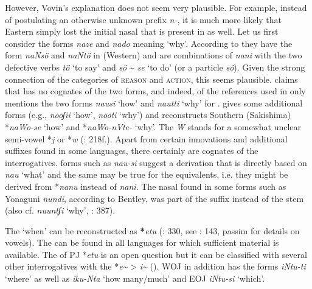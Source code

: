 However, Vovin’s explanation does not seem very plausible. For example, instead of postulating an otherwise unknown prefix \textit{n-}, it is much more likely that Eastern  simply lost the initial nasal that is present in   as well. Let us first consider the  forms \textit{naze} and \textit{nado} meaning ‘why’. According to \citet[333]{Vovin2005} they have the form \textit{naNsö} and \textit{naNtö} in (Western)  and are combinations of \textit{nani} with the two defective verbs \textit{tö} ‘to say’ and \textit{sö} {\textasciitilde} \textit{se} ‘to do’ (or a particle \textit{sö}). Given the strong connection of the categories of \textsc{reason} and \textsc{action}, this seems plausible. \citet[336]{Vovin2005} claims that   has no cognates of the two forms, and indeed, of the references used in  only \citet[106]{Shimoji2011a} mentions the two forms \textit{nausi} ‘how’ and \textit{nautti} ‘why’ for . \cite[268, 298f.]{Bentley2008a} gives some additional forms (e.g.,  \textit{nooʃii} ‘how’, \textit{nooti} ‘why’) and reconstructs Southern   (Sakishima) *\textit{naWo-se} ‘how’ and *\textit{naWo-nVte-} ‘why’. The \textit{W} stands for a somewhat unclear semi-vowel *\textit{j} or *\textit{w} (\citealt{Bentley2008a}: 218f.). Apart from certain innovations and additional suffixes found in some languages, there certainly are cognates of the  interrogatives.   forms such as  \textit{nau-si} suggest a derivation that is directly based on \textit{nau} ‘what’ and the same may be true for the  equivalents, i.e. they might be derived from *\textit{nanu} instead of \textit{nani}. The nasal found in some forms such as Yonaguni \textit{nundi}, according to Bentley, was part of the suffix instead of the stem (also cf.  \textit{nuuntʃ}\textit{i} ‘why’, \citealt{Miyara2015}: 387).

The  ‘when’ can be reconstructed as \textbf{*}\textit{etu} (\citealt{Vovin2005}: 330, see \citealt{Pellard2008}: 143, passim for details on vowels). The  can be found in all  languages for which sufficient material is available. The  of PJ *\textit{etu} is an open question but it can be classified with several other interrogatives with the  *\textit{e{\textasciitilde}} > \textit{i{\textasciitilde}} (). WOJ in addition has the forms \textit{iNtu-ti} ‘where’ as well as \textit{iku-Nta} ‘how many/much’ and EOJ \textit{iNtu-si} ‘which’.

